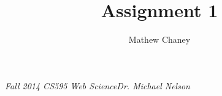 \documentclass[10pt,letterpaper]{article}
\begin{document}
\author{Mathew Chaney}
\title{Assignment 1}
\maketitle
\emph{Fall 2014 \newline CS595 Web Science\newline Dr. Michael Nelson}
\newpage
\tableofcontents




\end{document}
